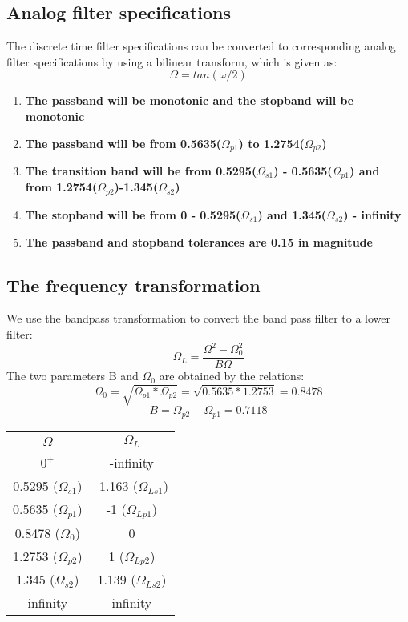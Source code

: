 \documentclass[12pt]{article}
\begin{document}
\subsection{Analog filter specifications }
The discrete time filter specifications can be converted to corresponding analog filter specifications by using a bilinear transform, which is given as:
\begin{equation}
    \Omega = tan(\omega/2)
\end{equation}
\begin{enumerate}
    \item \textbf{The passband will be monotonic and the stopband will be monotonic}
    \item \textbf{The passband will be from 0.5635($\Omega_{p1}$) to 1.2754($\Omega_{p2}$)}
    \item \textbf{The transition band will be from 0.5295($\Omega_{s1}$) - 0.5635($\Omega_{p1}$) and \\from 1.2754($\Omega_{p2}$)-1.345($\Omega_{s2}$)}
    \item \textbf{The stopband will be from 0 - 0.5295($\Omega_{s1}$) and 1.345($\Omega_{s2}$) - infinity}
    \item \textbf{The passband and stopband tolerances are 0.15 in magnitude}

\end{enumerate}
\subsection{The frequency transformation }
We use the bandpass transformation to convert the band pass filter to a lower filter:
\begin{equation}
    \Omega_L=\frac{\Omega^2-\Omega_{0}^2}{B\Omega}
\end{equation}
The two parameters B and $\Omega_{0}$ are obtained by the relations:
\begin{equation}
    \Omega_{0}=\sqrt{\Omega_{p1}*\Omega_{p2}}= \sqrt{0.5635*1.2753}=0.8478
    \end{equation}
    \begin{equation}   
    B=\Omega_{p2}-\Omega_{p1}=0.7118
 \end{equation}
 \begin{center}
\def\arraystretch{1.1}
\bgroup
\begin{tabular}{|c|c|}
\hline
\textbf{$\Omega$ }
& \textbf{$\Omega_L$ }\\ 
\hline \hline
$0^+$  &  -infinity  \\ 
\hline 
0.5295 ($\Omega_{s1}$)   &   -1.163 ($\Omega_{Ls1}$) \\ 
\hline
 0.5635 ($\Omega_{p1}$) &    -1 ($\Omega_{Lp1}$)\\ 
\hline
0.8478  ($\Omega_{0}$) & 0  \\ 
\hline
1.2753 ($\Omega_{p2}$)   &  1 ($\Omega_{Lp2}$) \\ 
\hline
 1.345 ($\Omega_{s2}$) &   1.139 ($\Omega_{Ls2}$) \\ 
 \hline
 infinity & infinity \\
 \hline
\end{tabular}
\egroup
\end{center}
\end{document}

